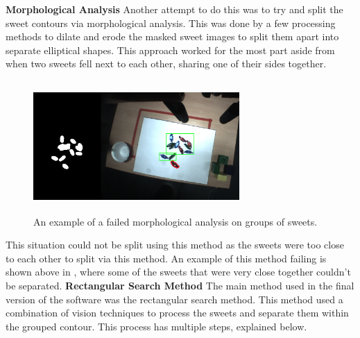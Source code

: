 \newline\newline
\textbf{Morphological Analysis}\newline
Another attempt to do this was to try and split the sweet contours via morphological analysis. This was done by a few processing methods to dilate and erode the masked sweet images to split them apart into separate elliptical shapes. This approach worked for the most part aside from when two sweets fell next to each other, sharing one of their sides together.
\captionsetup[figure]{justification=centering}
\begin{figure}[H]
        \centering 
        \includegraphics[width=0.7\textwidth, height=5cm]{morphellipse.png}
        \caption{An example of a failed morphological analysis on groups of sweets.}
        \label{fig:morphAnalysis}
\end{figure}
This situation could not be split using this method as the sweets were too close to each other to split via this method. An example of this method failing is shown above in \textbf{}, where some of the sweets that were very close together couldn't be separated.
\newline\newline
\textbf{Rectangular Search Method}
\newline
The main method used in the final version of the software was the rectangular search method. This method used a combination of vision techniques to process the sweets and separate them within the grouped contour. This process has multiple steps, explained below.
